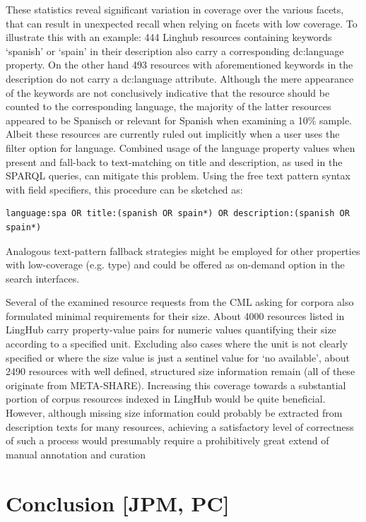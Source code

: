\documentclass[smallextended]{svjour3}       %
\begin{document}
These statistics reveal significant variation in coverage over the various
facets, that can result in unexpected recall when relying on facets with low
coverage. To illustrate this with an example: 444 Linghub resources containing
keywords `spanish' or `spain' in their description also carry a corresponding
dc:language property. On the other hand 493 resources with aforementioned
keywords in the description do not carry a dc:language attribute. Although the
mere appearance of the keywords are not conclusively indicative that the
resource should be counted to the corresponding language, the majority of the
latter resources appeared to be Spanisch or relevant for Spanish when examining
a 10\% sample. Albeit these resources are currently ruled out implicitly when a
user uses the filter option for language. Combined usage of the language
property values when present and fall-back to text-matching on title and
description, as used in the SPARQL queries, can mitigate this problem. Using the
free text pattern syntax with field specifiers, this procedure can be sketched
as: 

\begin{verbatim}
language:spa OR title:(spanish OR spain*) OR description:(spanish OR spain*)
\end{verbatim}

Analogous text-pattern fallback strategies might be employed for other
properties with low-coverage (e.g. type) and could be offered as on-demand
option in the search interfaces. 

Several of the examined resource requests from the CML asking for corpora also
formulated minimal requirements for their size. About 4000 resources listed in
LingHub carry property-value pairs for numeric values quantifying their size
according to a specified unit. Excluding also cases where the unit is not
clearly specified or where the size value is just a sentinel value for ‘no
available’, about 2490 resources with well defined, structured size information
remain (all of these originate from META-SHARE).  Increasing this coverage
towards a substantial portion of corpus resources indexed in LingHub would be
quite beneficial. However, although missing size information could probably be
extracted from description texts for many resources, achieving a satisfactory
level of correctness of such a process would presumably require a prohibitively
great extend of manual annotation and curation


\section{Conclusion [JPM, PC]}
\label{conclusion}

\end{document}
